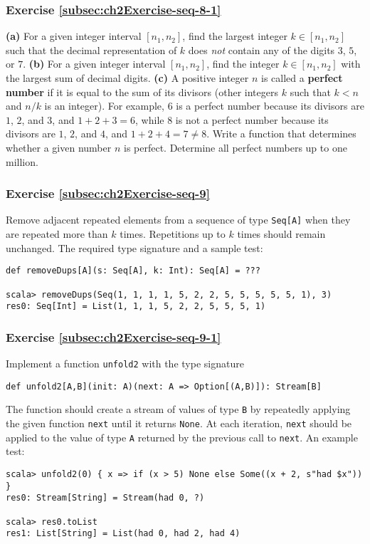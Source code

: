 \subsubsection{Exercise \label{subsec:ch2Exercise-seq-8-1}\ref{subsec:ch2Exercise-seq-8-1}}

\textbf{(a)} For a given integer interval $\left[n_{1},n_{2}\right]$,
find the largest integer $k\in\left[n_{1},n_{2}\right]$ such that
the decimal representation of $k$ does \emph{not} contain any of
the digits $3$, $5$, or $7$. \textbf{(b)} For a given integer interval
$\left[n_{1},n_{2}\right]$, find the integer $k\in\left[n_{1},n_{2}\right]$
with the largest sum of decimal digits. \textbf{(c)} A positive integer
$n$ is called a \textbf{perfect number} if
it is equal to the sum of its divisors (other integers $k$ such that
$k<n$ and $n/k$ is an integer). For example, $6$ is a perfect number
because its divisors are $1$, $2$, and $3$, and $1+2+3=6$, while
$8$ is not a perfect number because its divisors are $1$, $2$,
and $4$, and $1+2+4=7\neq8$. Write a function that determines whether
a given number $n$ is perfect. Determine all perfect numbers up to
one million.

\subsubsection{Exercise \label{subsec:ch2Exercise-seq-9}\ref{subsec:ch2Exercise-seq-9}}

Remove adjacent repeated elements from a sequence of type \lstinline!Seq[A]!
when they are repeated more than $k$ times. Repetitions up to $k$
times should remain unchanged. The required type signature and a sample
test:
\begin{lstlisting}
def removeDups[A](s: Seq[A], k: Int): Seq[A] = ???

scala> removeDups(Seq(1, 1, 1, 1, 5, 2, 2, 5, 5, 5, 5, 5, 1), 3)
res0: Seq[Int] = List(1, 1, 1, 5, 2, 2, 5, 5, 5, 1)
\end{lstlisting}


\subsubsection{Exercise \label{subsec:ch2Exercise-seq-9-1}\ref{subsec:ch2Exercise-seq-9-1}}

Implement a function
\lstinline!unfold2! with the type signature
\begin{lstlisting}
def unfold2[A,B](init: A)(next: A => Option[(A,B)]): Stream[B]
\end{lstlisting}
The function should create a stream of values of type \lstinline!B!
by repeatedly applying the given function \lstinline!next! until
it returns \lstinline!None!. At each iteration, \lstinline!next!
should be applied to the value of type \lstinline!A! returned by
the previous call to \lstinline!next!. An example test:
\begin{lstlisting}
scala> unfold2(0) { x => if (x > 5) None else Some((x + 2, s"had $x")) }
res0: Stream[String] = Stream(had 0, ?)

scala> res0.toList
res1: List[String] = List(had 0, had 2, had 4) 
\end{lstlisting}


